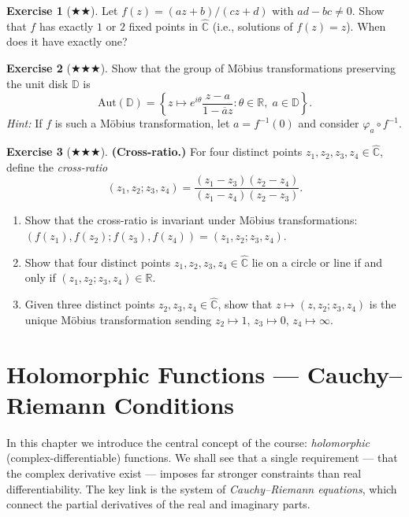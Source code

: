 \documentclass[12pt,a4paper,openany]{book}
\theoremstyle{definition}
\newtheorem{exercise}{Exercise}[chapter]
\theoremstyle{plain}
\theoremstyle{remark}
\newcommand{\C}{\mathbb{C}}
\newcommand{\R}{\mathbb{R}}
\newcommand{\D}{\mathbb{D}}
\newcommand{\conj}[1]{\overline{#1}}
\begin{document}
\begin{exercise}[$\bigstar\!\bigstar$]
\label{exo:ch1-8}
Let $f(z) = (az+b)/(cz+d)$ with $ad-bc\neq 0$. Show that $f$ has exactly $1$ or $2$ fixed points in $\hat{\C}$ (i.e., solutions of $f(z)=z$). When does it have exactly one?
\end{exercise}

\begin{exercise}[$\bigstar\!\bigstar\!\bigstar$]
\label{exo:ch1-9}
Show that the group of M\"obius transformations preserving the unit disk $\D$ is
\[
  \mathrm{Aut}(\D) = \left\{z\mapsto e^{i\theta}\frac{z-a}{1-\conj{a}z} : \theta\in\R,\; a\in\D\right\}.
\]
\textit{Hint:} If $f$ is such a M\"obius transformation, let $a=f^{-1}(0)$ and consider $\varphi_a\circ f^{-1}$.
\end{exercise}

\begin{exercise}[$\bigstar\!\bigstar\!\bigstar$]
\label{exo:ch1-10}
\textbf{(Cross-ratio.)} For four distinct points $z_1,z_2,z_3,z_4\in\hat{\C}$, define the \emph{cross-ratio}
\[
  (z_1,z_2;z_3,z_4) = \frac{(z_1-z_3)(z_2-z_4)}{(z_1-z_4)(z_2-z_3)}.
\]
\begin{enumerate}[label=\textup{(\alph*)}]
  \item Show that the cross-ratio is invariant under M\"obius transformations: $(f(z_1),f(z_2);f(z_3),f(z_4))=(z_1,z_2;z_3,z_4)$.
  \item Show that four distinct points $z_1,z_2,z_3,z_4\in\hat{\C}$ lie on a circle or line if and only if $(z_1,z_2;z_3,z_4)\in\R$.
  \item Given three distinct points $z_2,z_3,z_4\in\hat{\C}$, show that $z\mapsto (z,z_2;z_3,z_4)$ is the unique M\"obius transformation sending $z_2\mapsto 1$, $z_3\mapsto 0$, $z_4\mapsto\infty$.
\end{enumerate}
\end{exercise}

\chapter{Holomorphic Functions --- Cauchy--Riemann Conditions}
\label{ch:holomorphic}

In this chapter we introduce the central concept of the course: \emph{holomorphic} (complex-differentiable) functions. We shall see that a single requirement --- that the complex derivative exist --- imposes far stronger constraints than real differentiability. The key link is the system of \emph{Cauchy--Riemann equations}, which connect the partial derivatives of the real and imaginary parts.
\end{document}
